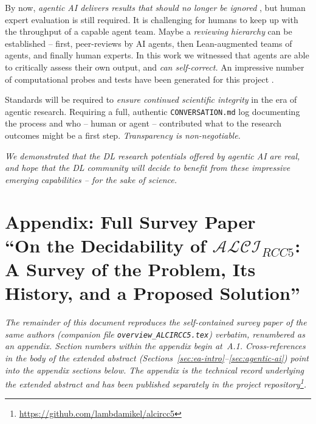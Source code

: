 \documentclass[
]{ceurart}
\theoremstyle{definition}
\newcommand{\Lean}{\textsf{Lean}}
\newcommand{\ALCIRCC}[1]{\ensuremath{\mathcal{ALCI}_{\mathit{RCC#1}}}}
\begin{document}
By now, \emph{agentic AI delivers results that should no longer be
ignored} \cite{TaoKlowden2026, Knuth2026ClaudesCycles}, but human
expert evaluation is still required. It is challenging for humans to
keep up with the throughput of a capable agent team. Maybe a
\emph{reviewing hierarchy} can be established -- first, peer-reviews
by AI agents, then \Lean-augmented teams of agents, and finally human
experts. In this work we witnessed that agents are able to critically
assess their own output, and \emph{can self-correct.}  An impressive
number of computational probes and tests have been generated for this
project \cite{QuasimodelReasoner, GISTaxonomy, CoverTreeReasoner,
  CyclicReasoner, ModelVerifier, DecompositionTest,
  StressTestCoverTree, StressTestCyclic, TestCyclicReasoner}.

Standards will be required to \emph{ensure continued scientific
integrity} in the era of agentic research. Requiring a full, authentic
{\tt CONVERSATION.md} log documenting the process and who -- human or
agent -- contributed what to the research outcomes might be a first
step. \emph{Transparency is non-negotiable.}

\emph{We demonstrated that the DL research potentials offered by agentic AI
are real, and hope that the DL community will decide to benefit from
these impressive emerging capabilities -- for the sake of science.}

\clearpage
\appendix

\section*{Appendix: Full Survey Paper\\\normalsize\normalfont
  ``On the Decidability of $\ALCIRCC{5}$:
  A Survey of the Problem, Its History, and a Proposed Solution''}
\label{sec:appendix}

\noindent\emph{The remainder of this document reproduces the
self-contained survey paper of the same authors (companion file
\texttt{overview\_ALCIRCC5.tex}) verbatim, renumbered as an appendix.
Section numbers within the appendix begin at~A.1.
Cross-references in the body of the extended abstract
(Sections~\ref{sec:ea-intro}--\ref{sec:agentic-ai}) point into the
appendix sections below. The appendix is the technical record
underlying the extended abstract and has been published
separately in the project repository\footnote{%
\url{https://github.com/lambdamikel/alcircc5}}.}

\renewcommand{\thesection}{A.\arabic{section}}
\setcounter{section}{0}
\end{document}
